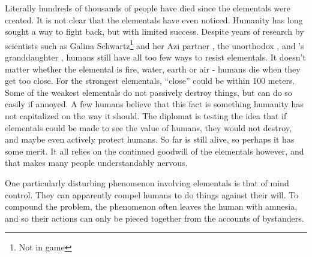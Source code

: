 \documentclass[blue]{elementals}
\begin{document}

Literally hundreds of thousands of people have died since the elementals were created. It is not clear that the elementals have even noticed. Humanity has long sought a way to fight back, but with limited success. Despite years of research by scientists such as Galina Schwartz\footnote{Not in game} and her Azi partner \cScientist{\full}, the unorthodox \cMS{\full}, and \cGrandfather{\full}'s granddaughter \cGD{}, humans still have all too few ways to resist elementals.  It doesn't matter whether the elemental is fire, water, earth or air - humans die when they get too close. For the strongest elementals, ``close'' could be within 100 meters. Some of the weakest elementals do not passively destroy things, but can do so easily if annoyed. A few humans believe that this fact is something humanity has not capitalized on the way it should. The diplomat \cDiplomat{\full} is testing the idea that if elementals could be made to see the value of humans, they would not destroy, and maybe even actively protect humans.  So far \cDiplomat{} is still alive, so perhaps it has some merit. It all relies on the continued goodwill of the elementals however, and that makes many people understandably nervous.

One particularly disturbing phenomenon involving elementals is that of mind control.  They can apparently compel humans to do things against their will. To compound the problem, the phenomenon often leaves the human with amnesia, and so their actions can only be pieced together from the accounts of bystanders.
\end{document}
